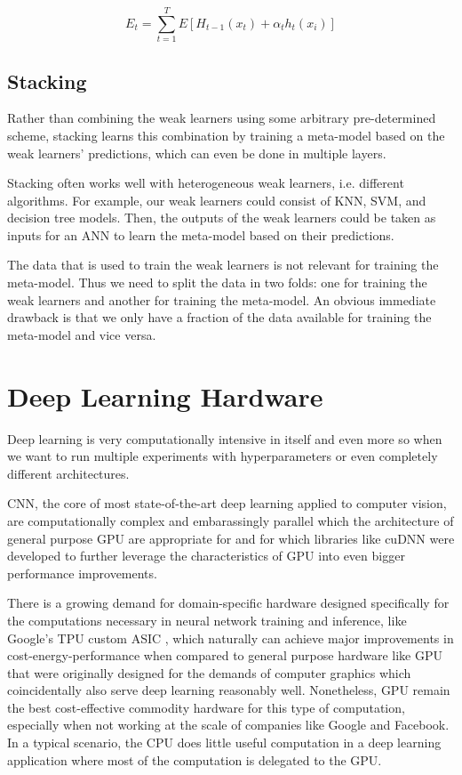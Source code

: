 $$
E_t = \sum_{t=1}^{T} E[H_{t-1}(x_t) + \alpha_t h_t(x_i)]
$$

\subsection{Stacking}

Rather than combining the weak learners using some arbitrary pre-determined scheme, stacking learns this combination by training a meta-model based on the weak learners' predictions, which can even be done in multiple layers.

Stacking often works well with heterogeneous weak learners, i.e. different algorithms. For example, our weak learners could consist of \ac{KNN}, \ac{SVM}, and decision tree models. Then, the outputs of the weak learners could be taken as inputs for an \ac{ANN} to learn the meta-model based on their predictions.

The data that is used to train the weak learners is not relevant for training the meta-model. Thus we need to split the data in two folds: one for training the weak learners and another for training the meta-model. An obvious immediate drawback is that we only have a fraction of the data available for training the meta-model and vice versa.

\section{Deep Learning Hardware}

Deep learning is very computationally intensive in itself and even more so when we want to run multiple experiments with hyperparameters or even completely different architectures.

\ac{CNN}, the core of most state-of-the-art deep learning applied to computer vision, are computationally complex and embarassingly parallel \cite{chang2017} which the architecture of general purpose \ac{GPU} are appropriate for \cite{gpu} and for which libraries like cuDNN \cite{cudnn} were developed to further leverage the characteristics of \ac{GPU} into even bigger performance improvements.

There is a growing demand for domain-specific hardware designed specifically for the computations necessary in neural network training and inference, like Google's TPU custom ASIC \cite{tpu}, which naturally can achieve major improvements in cost-energy-performance when compared to general purpose hardware like \ac{GPU} that were originally designed for the demands of computer graphics which coincidentally also serve deep learning reasonably well. Nonetheless, \ac{GPU} remain the best cost-effective commodity hardware for this type of computation, especially when not working at the scale of companies like Google and Facebook. In a typical scenario, the CPU does little useful computation in a deep learning application where most of the computation is delegated to the GPU.

